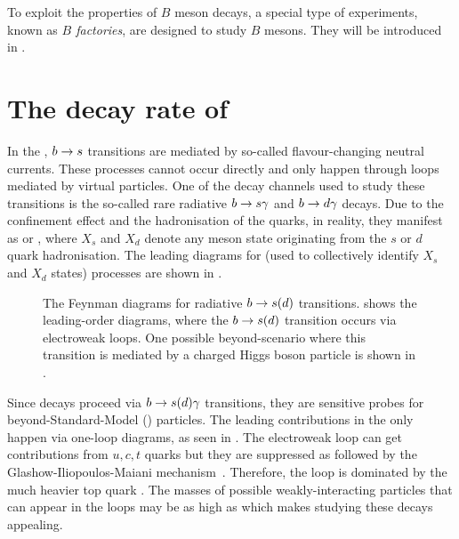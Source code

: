 To exploit the properties of $B$ meson decays, a special type of experiments, known as \textit{$B$ factories}, are designed to study $B$ mesons.
They will be introduced in .

\section{The decay rate of \texorpdfstring{\BtoXsdgamma}{B->Xsg}}\label{sec:btosgamma_totalrate_theory}

In the \SM, $b\rightarrow s$ transitions are mediated by so-called flavour-changing neutral currents.
These processes cannot occur directly and only happen through loops mediated by virtual particles.
One of the decay channels used to study these transitions is the so-called rare radiative $b\rightarrow s\gamma$ and $b\rightarrow d\gamma$ decays.
Due to the confinement effect and the hadronisation of the quarks, in reality, they manifest as \BtoXsgamma or \BtoXdgamma, where $X_s$ and $X_d$ denote any meson state originating from the $s$ or $d$ quark hadronisation.
The leading \SM diagrams for \BtoXsdgamma (used to collectively identify $X_s$ and $X_d$ states) processes are shown in .

\begin{figure}[hbtp!]
\resizebox{0.66\textwidth}{!}{
    \subcaptionbox{\label{fig:sm_diagrams}}{
        
        
    }
}
\resizebox{0.33\textwidth}{!}{
\subcaptionbox{\label{fig:bsm_diagrams}}{
    
}
}
\caption{\label{fig:b_to_s_gamma_diagrams}
The Feynman diagrams for radiative $b\rightarrow s(d)$ transitions. 
 shows the leading-order \SM diagrams, where the $b\rightarrow s(d)$ transition occurs via electroweak loops.
One possible beyond-\SM scenario where this transition is mediated by a charged Higgs boson particle is shown in .
}
\end{figure}

Since \BtoXsdgamma decays proceed via $b\rightarrow s(d)\gamma$ transitions, they are sensitive probes for beyond-Standard-Model (\BSM) particles. 
The leading contributions in the \SM only happen via one-loop diagrams, as seen in .
The electroweak loop can get contributions from $u,c,t$ quarks but they are suppressed as followed by the Glashow-Iliopoulos-Maiani mechanism~\cite{Glashow:1970gm}.
Therefore, the loop is dominated by the much heavier top quark \cite{Mannel:2001vn}. 
The masses of possible \BSM weakly-interacting particles that can appear in the loops may be as high as  \cite{Misiak:2020vlo} which makes studying these decays appealing.

